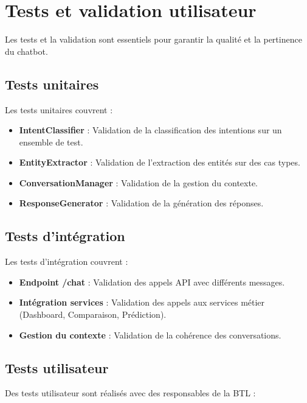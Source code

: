\section{Tests et validation utilisateur}
\label{sec:sprint6-tests}

Les tests et la validation sont essentiels pour garantir la qualité et la pertinence du chatbot.

\subsection{Tests unitaires}

Les tests unitaires couvrent :

\begin{itemize}
    \item \textbf{IntentClassifier} : Validation de la classification des intentions sur un ensemble de test.
    \item \textbf{EntityExtractor} : Validation de l'extraction des entités sur des cas types.
    \item \textbf{ConversationManager} : Validation de la gestion du contexte.
    \item \textbf{ResponseGenerator} : Validation de la génération des réponses.
\end{itemize}

\subsection{Tests d'intégration}

Les tests d'intégration couvrent :

\begin{itemize}
    \item \textbf{Endpoint /chat} : Validation des appels API avec différents messages.
    \item \textbf{Intégration services} : Validation des appels aux services métier (Dashboard, Comparaison, Prédiction).
    \item \textbf{Gestion du contexte} : Validation de la cohérence des conversations.
\end{itemize}

\subsection{Tests utilisateur}

Des tests utilisateur sont réalisés avec des responsables de la BTL :


